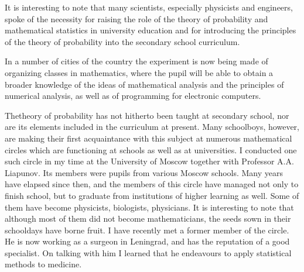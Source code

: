 It is interesting to note that many scientists, especially physicists
and engineers, spoke of the necessity for raising the role of the
theory of probability and mathematical statistics in university
education and for introducing the principles of the theory of
probability into the secondary school curriculum.

In a number of cities of the country the experiment is now being made
of organizing classes in mathematics, where the pupil will be able to
obtain a broader knowledge of the ideas of mathematical analysis and
the principles of numerical analysis, as well as of programming for
electronic computers. 

The\pageoriginale theory of probability has not hitherto been taught
at secondary school, nor are its elements included in the curriculum
at present. Many schoolboys, however, are making their first
acquaintance with this subject at numerous mathematical circles which
are functioning at schools as well as at universities. I conducted one
such circle in my time at the University of Moscow together with
Professor A.A. Liapunov. Its members were pupils from various Moscow
schools. Many years have elapsed since then, and the members of this
circle have managed not only to finish school, but to graduate from
institutions of higher learning as well. Some of them have become
physicists, biologists, physicians. It is interesting to note that
although most of them did not become mathematicians, the seeds sown in
their schooldays have borne fruit. I have recently met a former member
of the circle. He is now working as a surgeon in Leningrad, and has
the reputation of a good specialist. On talking with him I learned
that he endeavours to apply statistical methods to medicine.


